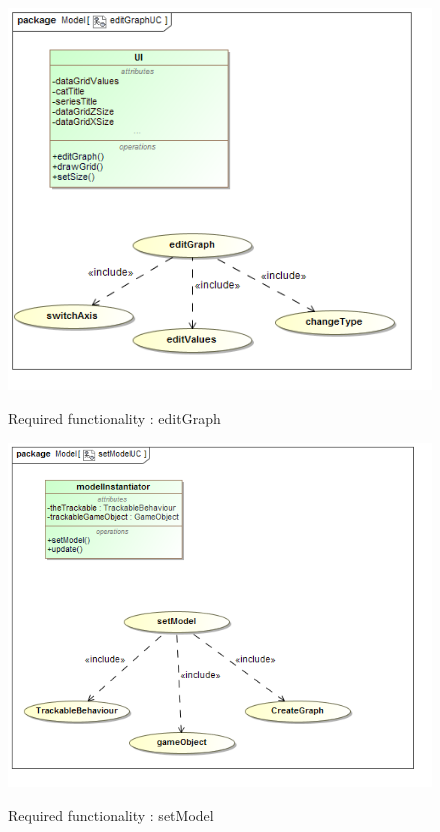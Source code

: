 \documentclass[a4paper,12pt]{article}
\begin{document}
	\begin{figure}[H]
		\includegraphics[width=\textwidth]{Images/editGraphUC.png}  \\
		\caption{Required functionality : editGraph}
	\end{figure}
	\begin{figure}[H]
		\includegraphics[width=\textwidth]{Images/setModelUC.png}  \\
		\caption{Required functionality : setModel}
	\end{figure}	
	
\end{document}

